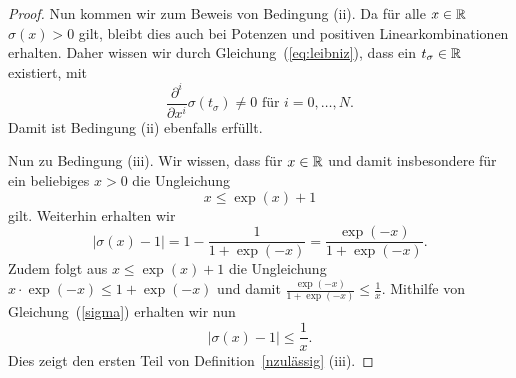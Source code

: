 \begin{proof}
Nun kommen wir zum Beweis von Bedingung (ii). 
Da für alle $x \in \mathbb{R}$ $\sigma(x) > 0$ gilt, bleibt dies auch bei Potenzen und positiven Linearkombinationen erhalten. Daher wissen wir durch Gleichung~(\ref{eq:leibniz}), dass ein $t_{\sigma} \in \mathbb{R}$ existiert, mit $$\frac{\partial^i}{\partial x^i}\sigma(t_{\sigma}) \neq 0 \text{ für } i = 0,\dots,N.$$
Damit ist Bedingung (ii) ebenfalls erfüllt.

Nun zu Bedingung (iii). Wir wissen, dass für $x \in \mathbb{R}$ und damit insbesondere für ein beliebiges $x > 0$ die Ungleichung $$ x \leq \exp(x) + 1$$ gilt. Weiterhin erhalten wir 
\begin{equation}
\label{sigma}
|\sigma(x) - 1| = 1 - \frac{1}{1 + \exp(-x)} = \frac{\exp(-x)}{1 + \exp(-x)}.
\end{equation}
Zudem folgt aus $x \leq \exp(x) + 1$ die Ungleichung $x \cdot \exp(-x) \leq 1 + \exp(-x)$ und damit $\frac{\exp(-x)}{1 + \exp(-x)} \leq \frac{1}{x}$. Mithilfe von Gleichung~(\ref{sigma}) erhalten wir nun 
$$
|\sigma(x) - 1| \leq \frac{1}{x}.
$$
Dies zeigt den ersten Teil von Definition~\ref{nzulässig} (iii).


\end{proof}
